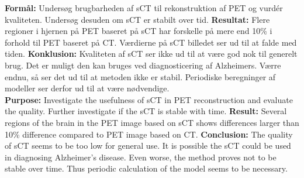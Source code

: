 \abstract

\textbf{Formål:} Undersøg brugbarheden af sCT til rekonstruktion af PET og vurdér kvaliteten. Undersøg desuden om sCT er stabilt over tid. \textbf{Resultat:} Flere regioner i hjernen på PET baseret på sCT har forskelle på mere end 10\% i forhold til PET baseret på CT. Værdierne på sCT billedet ser ud til at falde med tiden. \textbf{Konklusion:} Kvaliteten af sCT ser ikke ud til at være god nok til generelt brug. Det er muligt den kan bruges ved diagnosticering af Alzheimers. Værre endnu, så ser det ud til at metoden ikke er stabil. Periodiske beregninger af modeller ser derfor ud til at være nødvendige.\\

\textbf{Purpose:} Investigate the usefulness of sCT in PET reconstruction and evaluate the quality. Further investigate if the sCT is stable with time. \textbf{Result:} Several regions of the brain in the PET image based on sCT shows differences larger than 10\% difference compared to PET image based on CT. \textbf{Conclusion:} The quality of sCT seems to be too low for general use. It is possible the sCT could be used in diagnosing Alzheimer's disease. Even worse, the method proves not to be stable over time. Thus periodic calculation of the model seems to be necessary.

